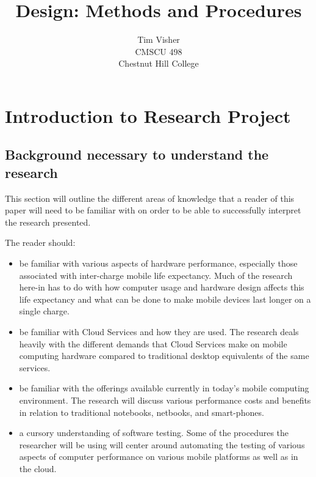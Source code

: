 \documentclass[12pt,oneside,letterpaper,titlepage]{article}
\author{Tim Visher\\ CMSCU 498\\ Chestnut Hill College}
\title{Design: Methods and Procedures}
\begin{document}
\maketitle

\tableofcontents

\newpage

\section{Introduction to Research Project}

\subsection{Background necessary to understand the research}

This section will outline the different areas of knowledge that a reader of this
paper will need to be familiar with on order to be able to successfully
interpret the research presented.

The reader should:

\begin{itemize}

\item be familiar with various aspects of hardware performance, especially those
  associated with inter-charge mobile life expectancy.  Much of the research
  here-in has to do with how computer usage and hardware design affects this
  life expectancy and what can be done to make mobile devices last longer on a
  single charge.

\item be familiar with Cloud Services and how they are used.  The research deals
  heavily with the different demands that Cloud Services make on mobile
  computing hardware compared to traditional desktop equivalents of the same
  services.

\item be familiar with the offerings available currently in today's mobile
  computing environment.  The research will discuss various performance costs
  and benefits in relation to traditional notebooks, netbooks, and smart-phones.

\item a cursory understanding of software testing.  Some of the procedures the
  researcher will be using will center around automating the testing of various
  aspects of computer performance on various mobile platforms as well as in the
  cloud.

\end{itemize}
\end{document}
